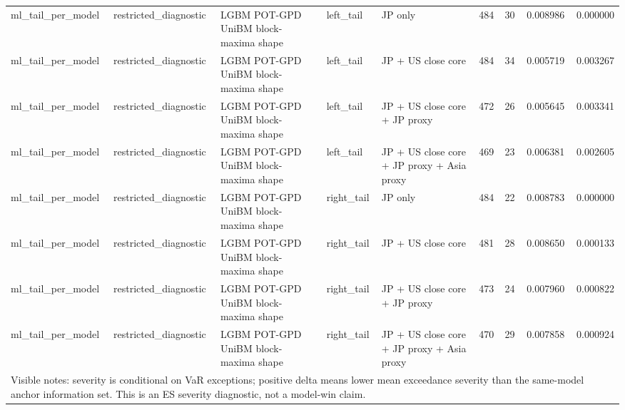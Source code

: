 \begin{tabular}{lllllrrrr}
ml\_tail\_per\_model & restricted\_diagnostic & LGBM POT-GPD UniBM block-maxima shape & left\_tail & JP only & 484 & 30 & 0.008986 & 0.000000 \\
ml\_tail\_per\_model & restricted\_diagnostic & LGBM POT-GPD UniBM block-maxima shape & left\_tail & JP + US close core & 484 & 34 & 0.005719 & 0.003267 \\
ml\_tail\_per\_model & restricted\_diagnostic & LGBM POT-GPD UniBM block-maxima shape & left\_tail & JP + US close core + JP proxy & 472 & 26 & 0.005645 & 0.003341 \\
ml\_tail\_per\_model & restricted\_diagnostic & LGBM POT-GPD UniBM block-maxima shape & left\_tail & JP + US close core + JP proxy + Asia proxy & 469 & 23 & 0.006381 & 0.002605 \\
ml\_tail\_per\_model & restricted\_diagnostic & LGBM POT-GPD UniBM block-maxima shape & right\_tail & JP only & 484 & 22 & 0.008783 & 0.000000 \\
ml\_tail\_per\_model & restricted\_diagnostic & LGBM POT-GPD UniBM block-maxima shape & right\_tail & JP + US close core & 481 & 28 & 0.008650 & 0.000133 \\
ml\_tail\_per\_model & restricted\_diagnostic & LGBM POT-GPD UniBM block-maxima shape & right\_tail & JP + US close core + JP proxy & 473 & 24 & 0.007960 & 0.000822 \\
ml\_tail\_per\_model & restricted\_diagnostic & LGBM POT-GPD UniBM block-maxima shape & right\_tail & JP + US close core + JP proxy + Asia proxy & 470 & 29 & 0.007858 & 0.000924 \\
\midrule
\multicolumn{9}{l}{\footnotesize Visible notes: severity is conditional on VaR exceptions; positive delta means lower mean exceedance severity than the same-model anchor information set. This is an ES severity diagnostic, not a model-win claim.} \\
\bottomrule
\end{tabular}
